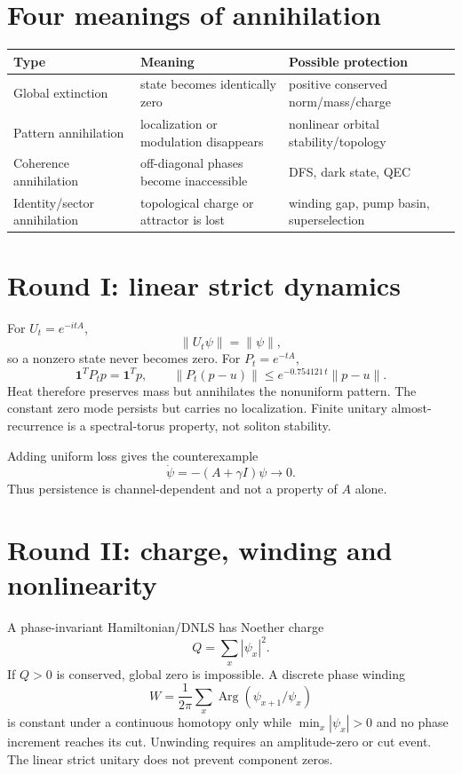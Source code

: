 \documentclass[11pt,a4paper]{article}
\begin{document}
\section{Four meanings of annihilation}
\begin{longtable}{@{}p{}p{}p{}@{}}\toprule Type&Meaning&Possible protection\\\midrule\endhead
Global extinction&state becomes identically zero&positive conserved norm/mass/charge\\
Pattern annihilation&localization or modulation disappears&nonlinear orbital stability/topology\\
Coherence annihilation&off-diagonal phases become inaccessible&DFS, dark state, QEC\\
Identity/sector annihilation&topological charge or attractor is lost&winding gap, pump basin, superselection\\\bottomrule\end{longtable}

\section{Round I: linear strict dynamics}
For $U_t=e^{-itA}$,
\[
\|U_t\psi\|=\|\psi\|,
\]
so a nonzero state never becomes zero. For $P_t=e^{-tA}$,
\[
\mathbf1^TP_tp=\mathbf1^Tp,
\qquad
\|P_t(p-u)\|\le e^{-0.754121\,t}\|p-u\|.
\]
Heat therefore preserves mass but annihilates the nonuniform pattern. The constant zero mode persists but carries no localization. Finite unitary almost-recurrence is a spectral-torus property, not soliton stability.

Adding uniform loss gives the counterexample
\[
\dot\psi=-(A+\gamma I)\psi\longrightarrow0.
\]
Thus persistence is channel-dependent and not a property of $A$ alone.

\section{Round II: charge, winding and nonlinearity}
A phase-invariant Hamiltonian/DNLS has Noether charge
\[
Q=\sum_x|\psi_x|^2.
\]
If $Q>0$ is conserved, global zero is impossible. A discrete phase winding
\[
W=\frac1{2\pi}\sum_x\operatorname{Arg}(\psi_{x+1}/\psi_x)
\]
is constant under a continuous homotopy only while $\min_x|\psi_x|>0$ and no phase increment reaches its cut. Unwinding requires an amplitude-zero or cut event. The linear strict unitary does not prevent component zeros.
\end{document}
